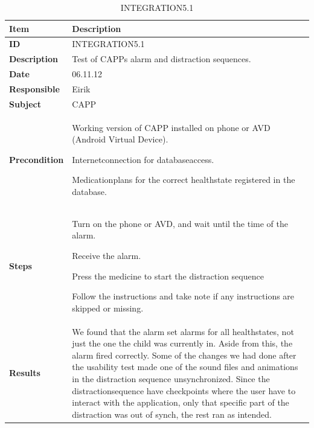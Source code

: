 \begin{table}
	\begin{center}
		\begin{tabular}{|p{3.0cm}|p{14.0cm}|}
			\hline
			\bf{Item} & \bf{Description}\\
			\hline
			\bf{ID} & INTEGRATION5.1\\
			\bf{Description} & Test of CAPPs alarm and distraction sequences.\\
			\bf{Date} & 06.11.12\\
			\bf{Responsible} & Eirik\\
			\bf{Subject} & CAPP\\
			\bf{Precondition} & 
				\begin{tabulitem}
					\item Working version of CAPP installed on phone or AVD (Android Virtual Device).
					\item Internetconnection for databaseaccess.
					\item Medicationplans for the correct healthstate registered in the database.
				\end{tabulitem}\\
			\bf{Steps} &
			\begin{tabulenum}
				\item Turn on the phone or AVD, and wait until the time of the alarm.
				\item Receive the alarm.
				\item Press the medicine to start the distraction sequence
				\item Follow the instructions and take note if any instructions are skipped or missing.
			\end{tabulenum}\\
			\hline
			\bf{Results} & We found that the alarm set alarms for all healthstates, not just the one the child was currently in. Aside from this, the alarm fired correctly.
						Some of the changes we had done after the usability test made one of the sound files and animations in the distraction sequence 
						unsynchronized. Since the distractionsequence have checkpoints where the user have to interact with the application, only that 
						specific part of the distraction was out of synch, the rest ran as intended.\\
			\hline
		\end{tabular}
	\end{center}
	\caption{INTEGRATION5.1}
	\label{tab:integration5.1}
\end{table}

